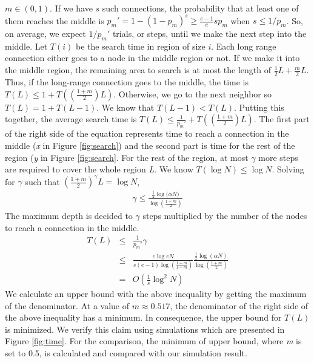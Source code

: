 \documentclass[9.5pt,journal,final,finalsubmission,twocolumn]{IEEEtran}
\begin{document}
$m\in (0,1)$. 
If we have $s$ such connections, the probability that
at least one of them reaches the middle is $p_m' = 1-(1-p_m)^s \ge \frac{e-1}{e}s p_m$
when $s\le 1/p_m$.  So, on average, we expect $1/p_m'$ trials, or steps, until
we make the next step into the middle.
Let $T(i)$ be the search time in region of size $i$.
Each long range connection either goes to a node in the
middle region or not.
If we make it into the middle region, the remaining area
to search is at most the length of $\frac{1}{2}L + \frac{m}{2}L$.
Thus,
if the long-range connection goes to the middle, the time is 
$T(L) \leq 1 + T((\frac{1+m}{2})L)$. 
Otherwise, we go to the next neighbor so $T(L) = 1 + T(L-1)$.
We know that $T(L-1) < T(L)$. 
Putting this together,
the average search time is
$T(L) \leq \frac{1}{p_m'} + T((\frac{1+m}{2})L)$. 
The first part of the right side of the equation represents time to reach 
a connection in the middle (\textit{x} in Figure \ref{fig:search}) and 
the second part is time for the rest of the region (\textit{y} in Figure \ref{fig:search}. 
For the rest of the region, at most $\gamma$ more steps are required to 
cover the whole region \textit{L}. We know $T(\log{N}) \leq \log N$. 
Solving for $\gamma$ such that $(\frac{1+m}{2})^{\gamma}L = \log N$, 
\begin{eqnarray*}
\gamma \leq \frac{\frac{1}{2}\log{(\alpha N})}{\log{(\frac{1+m}{2})}}
\end{eqnarray*}
The maximum depth is decided to $\gamma$ steps multiplied by the number of the nodes 
to reach a connection in the middle.
\begin{eqnarray*}
T(L) &\leq& \frac{1}{p_m'}\gamma \\
     &\leq& \frac{e\log eN}{s(e-1)\log{(\frac{1+m}{1-m})}}\frac{\frac{1}{2}\log{(\alpha N)}}{\log{(\frac{1+m}{2})}}
 \\
    &=&O(\frac{1}{s}\log^2 N)
\end{eqnarray*}
We calculate an upper bound with the above inequality by getting the maximum 
of the denominator.
At a value of $m\approx0.517$, the denominator of the right side of the above inequality has a minimum. 
In consequence, the upper bound for $T(L)$ is minimized.
We verify this claim using simulations which are presented in Figure \ref{fig:time}. 
For the comparison, the minimum of upper bound, where \textit{m} is set to 0.5, is 
calculated and compared with our simulation result.
\end{document}

